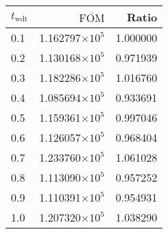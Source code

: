\begin{tabular}{lrr}
\toprule
$t_{\mathrm{wdt}}$ & $\overline{\mathrm{FOM}}$ &    Ratio \\
\midrule
               0.1 &   1.162797$\times 10^{5}$ & 1.000000 \\
               0.2 &   1.130168$\times 10^{5}$ & 0.971939 \\
               0.3 &   1.182286$\times 10^{5}$ & 1.016760 \\
               0.4 &   1.085694$\times 10^{5}$ & 0.933691 \\
               0.5 &   1.159361$\times 10^{5}$ & 0.997046 \\
               0.6 &   1.126057$\times 10^{5}$ & 0.968404 \\
               0.7 &   1.233760$\times 10^{5}$ & 1.061028 \\
               0.8 &   1.113090$\times 10^{5}$ & 0.957252 \\
               0.9 &   1.110391$\times 10^{5}$ & 0.954931 \\
               1.0 &   1.207320$\times 10^{5}$ & 1.038290 \\
\bottomrule
\end{tabular}
